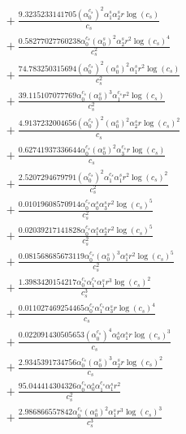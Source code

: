 \documentclass[10pt]{article}
\begin{document}
\begin{align*}
&{}  + \frac{9.3235233141705 \left(\alpha_{0}^{c_s}\right)^{2} \alpha_{1}^s \alpha_{2}^s r \log{\left(c_{s} \right)}}{c_{s}} \\
&{}  + \frac{0.58277027760238 \alpha_{0}^{c_s} \left(\alpha_{0}^s\right)^{2} \alpha_{2}^s r^{2} \log{\left(c_{s} \right)}^{4}}{c_{s}^{2}} \\
&{}  + \frac{74.783250315694 \left(\alpha_{0}^{c_s}\right)^{2} \left(\alpha_{0}^s\right)^{2} \alpha_{1}^s r^{2} \log{\left(c_{s} \right)}}{c_{s}^{2}} \\
&{}  + \frac{39.115107077769 \alpha_{0}^{c_s} \left(\alpha_{0}^s\right)^{3} \alpha_{1}^{c_s} r^{2} \log{\left(c_{s} \right)}}{c_{s}^{2}} \\
&{}  + \frac{4.9137232004656 \left(\alpha_{0}^{c_s}\right)^{2} \left(\alpha_{0}^s\right)^{2} \alpha_{2}^s r \log{\left(c_{s} \right)}^{2}}{c_{s}} \\
&{}  + \frac{0.62741937336644 \alpha_{0}^{c_s} \left(\alpha_{0}^s\right)^{2} \alpha_{3}^{c_s} r \log{\left(c_{s} \right)}}{c_{s}} \\
&{}  + \frac{2.5207294679791 \left(\alpha_{0}^{c_s}\right)^{2} \alpha_{1}^{c_s} \alpha_{1}^s r^{2} \log{\left(c_{s} \right)}^{2}}{c_{s}^{2}} \\
&{}  + \frac{0.01019608570914 \alpha_{0}^{c_s} \alpha_{0}^s \alpha_{3}^s r^{2} \log{\left(c_{s} \right)}^{5}}{c_{s}^{2}} \\
&{}  + \frac{0.02039217141828 \alpha_{0}^{c_s} \alpha_{1}^s \alpha_{2}^s r^{2} \log{\left(c_{s} \right)}^{5}}{c_{s}^{2}} \\
&{}  + \frac{0.081568685673119 \alpha_{0}^{c_s} \left(\alpha_{0}^s\right)^{3} \alpha_{1}^s r^{2} \log{\left(c_{s} \right)}^{5}}{c_{s}^{2}} \\
&{}  + \frac{1.3983420154217 \alpha_{0}^{c_s} \alpha_{1}^{c_s} \alpha_{1}^s r^{3} \log{\left(c_{s} \right)}^{2}}{c_{s}^{3}} \\
&{}  + \frac{0.011027469254465 \alpha_{0}^{c_s} \alpha_{1}^{c_s} \alpha_{3}^s r \log{\left(c_{s} \right)}^{4}}{c_{s}} \\
&{}  + \frac{0.022091430505653 \left(\alpha_{0}^{c_s}\right)^{4} \alpha_{0}^s \alpha_{1}^s r \log{\left(c_{s} \right)}^{3}}{c_{s}} \\
&{}  + \frac{2.9345391734756 \alpha_{0}^{c_s} \left(\alpha_{0}^s\right)^{3} \alpha_{2}^s r \log{\left(c_{s} \right)}^{2}}{c_{s}} \\
&{}  + \frac{95.044414304326 \alpha_{0}^{c_s} \alpha_{0}^s \alpha_{1}^{c_s} \alpha_{1}^s r^{2}}{c_{s}^{2}} \\
&{}  + \frac{2.986866557842 \alpha_{0}^{c_s} \left(\alpha_{0}^s\right)^{2} \alpha_{1}^s r^{3} \log{\left(c_{s} \right)}^{3}}{c_{s}^{3}}
\end{align*}
\end{document}
